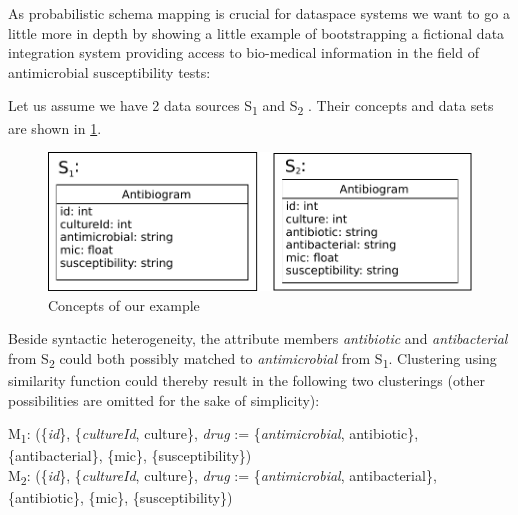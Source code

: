 As probabilistic schema mapping is crucial for dataspace systems we want to go a little more in depth by showing a little example of bootstrapping a fictional data integration system providing access to bio-medical information in the field of antimicrobial susceptibility tests:

Let us assume we have 2 data sources S\textsubscript{1} and S\textsubscript{2} . 
Their concepts and data sets are shown in \ref{PMappingExampleConcepts}.

\begin{figure}[H]
	\begin{center}
		\includegraphics[scale=0.75]{figures/PMappingExampleConcepts.pdf}
	\end{center}
	\caption{Concepts of our example}
	\label{PMappingExampleConcepts}
\end{figure}

Beside syntactic heterogeneity,  the attribute members \textit{antibiotic} and \textit{antibacterial} from S\textsubscript{2} could both possibly matched to \textit{antimicrobial} from S\textsubscript{1}. Clustering using similarity function could thereby result in the following two clusterings (other possibilities are omitted for the sake of simplicity):

M\textsubscript{1}: (\{\textit{id}\}, \{\textit{cultureId}, culture\}, \textit{drug} := \{\textit{antimicrobial}, antibiotic\}, \{antibacterial\}, \{mic\}, \{susceptibility\})\\
M\textsubscript{2}: (\{\textit{id}\}, \{\textit{cultureId}, culture\},  \textit{drug} := \{\textit{antimicrobial}, antibacterial\}, \{antibiotic\}, \{mic\}, \{susceptibility\})


